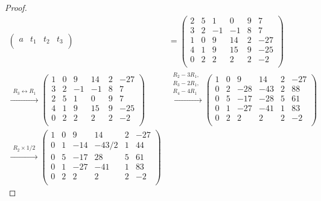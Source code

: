\documentclass[12pt]{article}
\newenvironment{problem}[2][Problem]{\begin{trivlist}
\item[\hskip \labelsep {\bfseries #1}\hskip \labelsep {\bfseries #2.}]}{\end{trivlist}}
\begin{document}
\begin{problem}{1.ii}
\end{problem}
\begin{proof}
\begin{align*}
\left( \begin{array}{c|c|c|c}
a & t_1 & t_2 & t_3\\ 
\end{array} \right)
&=
\left( \begin{array}{ccc|c|c|c}
2 & 5 & 1 & 0 & 9 & 7\\ 
3 & 2 & -1 & -1 & 8 & 7\\
1 & 0 & 9 & 14 & 2 & -27\\ 
4 & 1 & 9 & 15 & 9 & -25\\ 
0 & 2 & 2 & 2 & 2 & -2\\ 
\end{array} \right) \\
\xrightarrow{\substack{R_3 \leftrightarrow R_1}} 
\left( \begin{array}{ccc|c|c|c}
1 & 0 & 9 & 14 & 2 & -27\\ 
3 & 2 & -1 & -1 & 8 & 7\\
2 & 5 & 1 & 0 & 9 & 7\\ 
4 & 1 & 9 & 15 & 9 & -25\\ 
0 & 2 & 2 & 2 & 2 & -2\\ 
\end{array} \right) 
&\xrightarrow{\substack{R_2 - 3R_1,\\ R_3 - 2R_1,\\ R_4 - 4R_1}} 
\left( \begin{array}{ccc|c|c|c}
1 & 0 & 9 & 14 & 2 & -27\\ 
0 & 2 & -28 & -43 & 2 & 88\\
0 & 5 & -17 & -28 & 5 & 61\\ 
0 & 1 & -27 & -41 & 1 & 83\\ 
0 & 2 & 2 & 2 & 2 & -2\\ 
\end{array} \right) \\
\xrightarrow{\substack{R_2 \times 1/2}} 
\left( \begin{array}{ccc|c|c|c}
1 & 0 & 9 & 14 & 2 & -27\\ 
0 & 1 & -14 & -43/2 & 1 & 44\\
0 & 5 & -17 & 28 & 5 & 61\\ 
0 & 1 & -27 & -41 & 1 & 83\\ 
0 & 2 & 2 & 2 & 2 & -2\\ 
\end{array} \right) 

\end{align*}
\end{proof}
\end{document}
